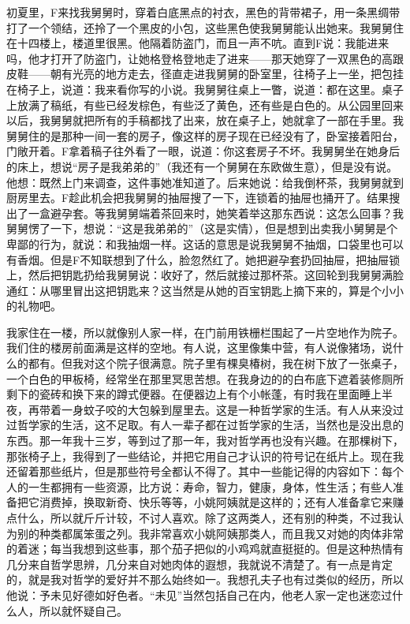 初夏里，F来找我舅舅时，穿着白底黑点的衬衣，黑色的背带裙子，用一条黑绸带打了一个领结，还拎了一个黑皮的小包，这些黑色使我舅舅能认出她来。我舅舅住在十四楼上，楼道里很黑。他隔着防盗门，而且一声不吭。直到F说：我能进来吗，他才打开了防盗门，让她格登格登地走了进来——那天她穿了一双黑色的高跟皮鞋——朝有光亮的地方走去，径直走进我舅舅的卧室里，往椅子上一坐，把包挂在椅子上，说道：我来看你写的小说。我舅舅往桌上一瞥，说道：都在这里。桌子上放满了稿纸，有些已经发棕色，有些泛了黄色，还有些是白色的。从公园里回来以后，我舅舅就把所有的手稿都找了出来，放在桌子上，她就拿了一部在手里。我舅舅住的是那种一间一套的房子，像这样的房子现在已经没有了，卧室接着阳台，门敞开着。F拿着稿子往外看了一眼，说道：你这套房子不坏。我舅舅坐在她身后的床上，想说“房子是我弟弟的”（我还有一个舅舅在东欧做生意），但是没有说。他想：既然上门来调查，这件事她准知道了。后来她说：给我倒杯茶，我舅舅就到厨房里去。F趁此机会把我舅舅的抽屉搜了一下，连锁着的抽屉也捅开了。结果搜出了一盒避孕套。等我舅舅端着茶回来时，她笑着举这那东西说：这怎么回事？我舅舅愣了一下，想说：“这是我弟弟的”（这是实情），但是想到出卖我小舅舅是个卑鄙的行为，就说：和我抽烟一样。这话的意思是说我舅舅不抽烟，口袋里也可以有香烟。但是F不知联想到了什么，脸忽然红了。她把避孕套扔回抽屉，把抽屉锁上，然后把钥匙扔给我舅舅说：收好了，然后就接过那杯茶。这回轮到我舅舅满脸通红：从哪里冒出这把钥匙来？这当然是从她的百宝钥匙上摘下来的，算是个小小的礼物吧。 

我家住在一楼，所以就像别人家一样，在门前用铁栅栏围起了一片空地作为院子。我们住的楼房前面满是这样的空地。有人说，这里像集中营，有人说像猪场，说什么的都有。但我对这个院子很满意。院子里有棵臭椿树，我在树下放了一张桌子，一个白色的甲板椅，经常坐在那里冥思苦想。在我身边的的白布底下遮着装修厕所剩下的瓷砖和换下来的蹲式便器。在便器边上有个小帐蓬，有时我在里面睡上半夜，再带着一身蚊子咬的大包躲到屋里去。这是一种哲学家的生活。有人从来没过过哲学家的生活，这不足取。有人一辈子都在过哲学家的生活，当然也是没出息的东西。那一年我十三岁，等到过了那一年，我对哲学再也没有兴趣。在那棵树下，那张椅子上，我得到了一些结论，并把它用自己才认识的符号记在纸片上。现在我还留着那些纸片，但是那些符号全都认不得了。其中一些能记得的内容如下：每个人的一生都拥有一些资源，比方说：寿命，智力，健康，身体，性生活；有些人准备把它消费掉，换取新奇、快乐等等，小姚阿姨就是这样的；还有人准备拿它来赚点什么，所以就斤斤计较，不讨人喜欢。除了这两类人，还有别的种类，不过我认为别的种类都属笨蛋之列。我非常喜欢小姚阿姨那类人，而且我又对她的肉体非常的着迷；每当我想到这些事，那个茄子把似的小鸡鸡就直挺挺的。但是这种热情有几分来自哲学思辨，几分来自对她肉体的遐想，我就说不清楚了。有一点是肯定的，就是我对哲学的爱好并不那么始终如一。我想孔夫子也有过类似的经历，所以他说：予未见好德如好色者。“未见”当然包括自己在内，他老人家一定也迷恋过什么人，所以就怀疑自己。 

